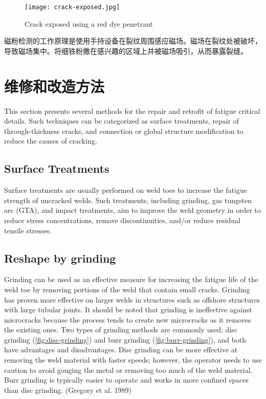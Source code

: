 \begin{figure}
  \texttt{[image: crack-exposed.jpg]}
  \caption{Crack exposed using a red dye penetrant}
  \label{fig:crack-exposed}
\end{figure}

磁粉检测的工作原理是使用手持设备在裂纹周围感应磁场。磁场在裂纹处被破坏，导致磁场集中。将细铁粉撒在感兴趣的区域上并被磁场吸引，从而暴露裂缝。

\section{维修和改造方法}
This section presents several methods for the repair and retrofit of fatigue critical details. Such techniques can be
categorized as surface treatments, repair of through-thickness cracks, and connection or global structure modification
to reduce the causes of cracking.

\subsection{Surface Treatments}
Surface treatments are usually performed on weld toes to increase the fatigue strength of uncracked welds. Such
treatments, including grinding, gas tungsten arc (GTA), and impact treatments, aim to improve the weld geometry in
order to reduce stress concentrations, remove discontinuities, and/or reduce residual tensile stresses.

\subsection{Reshape by grinding}
Grinding can be used as an effective measure for increasing the fatigue life of the weld toe by removing portions
of the weld that contain small cracks. Grinding has proven more effective on larger welds in structures such as
offshore structures with large tubular joints. It should be noted that grinding is ineffective against microcracks
because the process tends to create new microcracks as it removes the existing ones. Two types of grinding methods
are commonly used; disc grinding (\cref{fig:disc-grinding}) and burr grinding (\cref{fig:burr-grinding}), and both have advantages and
disadvantages. Disc grinding can be more effective at removing the weld material with faster speeds; however, the
operator needs to use caution to avoid gouging the metal or removing too much of the weld material. Burr grinding is
typically easier to operate and works in more confined spaces than disc grinding. (Gregory et al. 1989)

